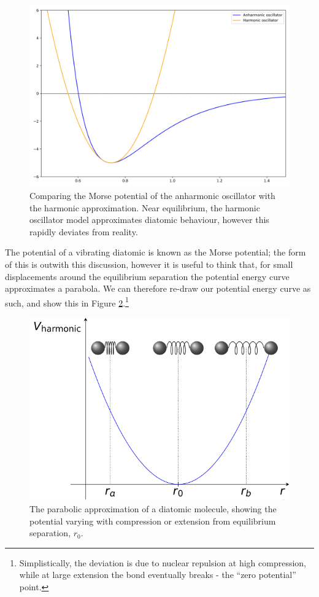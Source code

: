 \documentclass[
]{book}
\begin{document}
\begin{figure}

{\centering \includegraphics[width=0.7\linewidth]{visualisations/ch2-diatomicexamp} 

}

\caption{Comparing the Morse potential of the anharmonic oscillator with the harmonic approximation. Near equilibrium, the harmonic oscillator model approximates diatomic behaviour, however this rapidly deviates from reality. }\label{fig:ch2-diatomicmolecule1}
\end{figure}

The potential of a vibrating diatomic is known as the Morse potential; the form of this is outwith this discussion, however it is useful to think that, for small displacements around the equilibrium separation the potential energy curve approximates a parabola. We can therefore re-draw our potential energy curve as such, and show this in Figure \ref{fig:ch2-diatomicmolecule2}.\footnote{Simplistically, the deviation is due to nuclear repulsion at high compression, while at large extension the bond eventually breaks - the ``zero potential'' point.}

\begin{figure}

{\centering \includegraphics[width=0.7\linewidth]{visualisations//latex/ch2-diatomicmolecule2} 

}

\caption{The parabolic approximation of a diatomic molecule, showing the potential varying with compression or extension from equilibrium separation, $r_0$. }\label{fig:ch2-diatomicmolecule2}
\end{figure}
\end{document}
